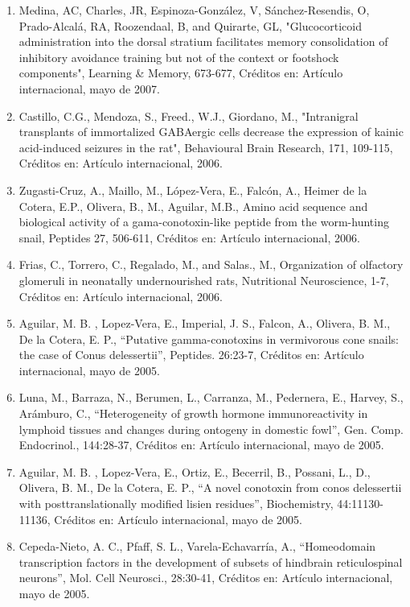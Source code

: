 \begin{enumerate}
\item Medina, AC, Charles, JR, Espinoza-González, V, Sánchez-Resendis, O, Prado-Alcalá, RA, Roozendaal, B, and Quirarte, 
GL, 
"Glucocorticoid administration into the dorsal stratium facilitates memory consolidation of inhibitory avoidance training 
but not of the context or footshock components", Learning \& Memory, 673-677, Créditos en: Artículo internacional, mayo de 
2007.

\item Castillo, C.G., Mendoza, S., Freed., W.J., Giordano, M., "Intranigral transplants of immortalized GABAergic cells 
decrease the expression of kainic acid-induced seizures in the rat", Behavioural Brain Research, 171, 109-115, Créditos en: 
Artículo internacional, 2006.

\item Zugasti-Cruz, A., Maillo, M., López-Vera, E., Falcón, A., Heimer de la Cotera, E.P., Olivera, B., M., Aguilar, M.B., 
Amino acid sequence and biological activity of a gama-conotoxin-like peptide from the worm-hunting snail, Peptides 27, 
506-611, Créditos en: Artículo internacional, 2006.

\item Frias, C., Torrero, C., Regalado, M., and Salas., M., Organization of olfactory glomeruli in neonatally 
undernourished 
rats, Nutritional Neuroscience, 1-7, Créditos en: Artículo internacional, 2006.

\item Aguilar, M. B. , Lopez-Vera, E., Imperial, J. S., Falcon, A., Olivera, B. M., De la Cotera, E. P., “Putative 
gamma-conotoxins in vermivorous cone snails: the case of Conus delessertii”, Peptides. 26:23-7, Créditos en: Artículo 
internacional, mayo de 2005.

\item Luna, M., Barraza, N., Berumen, L., Carranza, M., Pedernera, E., Harvey, S., Arámburo, C., “Heterogeneity of growth 
hormone immunoreactivity in lymphoid tissues and changes during ontogeny in domestic fowl”, Gen. Comp. Endocrinol., 
144:28-37, Créditos en: Artículo internacional, mayo de 2005.

\item Aguilar, M. B. , Lopez-Vera, E., Ortiz, E., Becerril, B., Possani, L., D., Olivera, B. M., De la Cotera, E. P., “A 
novel conotoxin from conos delessertii with posttranslationally modified lisien residues”, Biochemistry, 
44:11130-11136, Créditos en: Artículo internacional, mayo de 2005.

\item Cepeda-Nieto, A. C., Pfaff, S. L., Varela-Echavarría, A., “Homeodomain transcription factors in the development of 
subsets of hindbrain reticulospinal neurons”, Mol. Cell Neurosci., 28:30-41, Créditos en: Artículo internacional, mayo de 
2005.


\end{enumerate}
